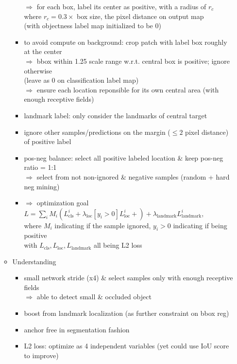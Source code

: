 \begin{itemize}
\begin{itemize}
\begin{itemize}
		$\Rightarrow$ for each box, label its center as positive, with a radius of $r_c$ \\
		where $r_c = 0.3\times$ box size, the pixel distance on output map \\
		(with objectness label map initialized to be 0)
		\item to avoid compute on background: crop patch with label box roughly at the center \\
		$\Rightarrow$ bbox within 1.25 scale range w.r.t. central box is positive; ignore otherwise \\
		(leave as 0 on classification label map) \\
		$\Rightarrow$ ensure each location reponsible for its own central area (with enough receptive fields)
		\item landmark label: only consider the landmarks of central target
		\item ignore other samples/predictions on the margin ($\le 2$ pixel distance) of positive label
		\item pos-neg balance: select all positive labeled location \& keep pos-neg ratio = 1:1 \\
		$\Rightarrow$ select from not non-ignored \& negative samples (random + hard neg mining)
		\item $\Rightarrow$ optimization goal $L=\sum_{i}M_i \left( L_\text{cls}^i + \lambda_\text{loc}[y_i>0]L_\text{loc}^i +  \right) + \lambda_\text{landmark} L_\text{landmark}^i$, \\
		where $M_i$ indicating if the sample ignored, $y_i>0$ indicating if being positive \\
		with $L_\text{cls}, L_\text{loc}, L_\text{landmark}$ all being L2 loss
		\end{itemize}
	\item Understanding
		\begin{itemize}
		\item small network stride (x4) \& select samples only with enough receptive fields \\
		$\Rightarrow$ able to detect small \& occluded object
		\item boost from landmark localization (as further constraint on bbox reg)
		\item anchor free in segmentation fashion
		\item L2 loss: optimize as 4 independent variables (yet could use IoU score to improve)
		\end{itemize}
	\end{itemize}


\end{itemize}
